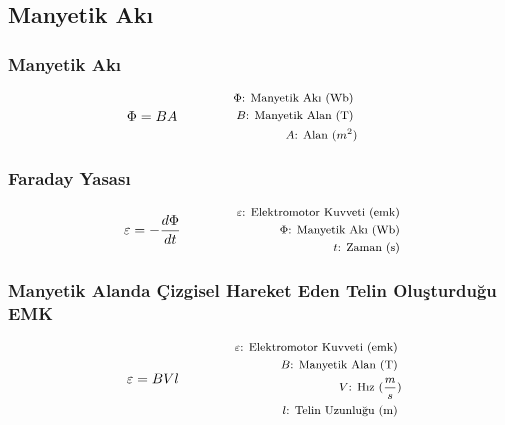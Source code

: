 \subsection{Manyetik Akı}

\subsubsection*{Manyetik Akı}
\begin{equation}
    \Phi = B A \qquad \qquad \parbox{4cm}{\footnotesize$\begin{aligned}
        \Phi\text{: Manyetik Akı (Wb) } \\
        B\text{: Manyetik Alan (T) } \\
        A\text{: Alan } (m^2)
\end{aligned}$}
\end{equation}

\subsubsection*{Faraday Yasası}
\begin{equation}
    \varepsilon = - \frac{d\Phi}{dt} \qquad \qquad \parbox{4cm}{\footnotesize$\begin{aligned}
        \varepsilon\text{: Elektromotor Kuvveti (emk) } \\
        \Phi\text{: Manyetik Akı (Wb) } \\
        t\text{: Zaman (s) }
\end{aligned}$}
\end{equation}

\subsubsection*{Manyetik Alanda Çizgisel Hareket Eden Telin Oluşturduğu EMK}
\begin{equation}
    \varepsilon = BVl \qquad \qquad \parbox{4cm}{\footnotesize$\begin{aligned}
        \varepsilon\text{: Elektromotor Kuvveti (emk) } \\
        B\text{: Manyetik Alan (T) } \\
        V\text{: Hız } (\frac{m}{s}) \\
        l\text{: Telin Uzunluğu (m) }
\end{aligned}$}
\end{equation}

